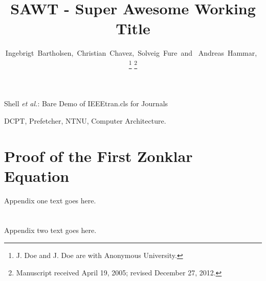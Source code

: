 \documentclass[journal]{IEEEtran}
\begin{document}
\title{SAWT - Super Awesome Working Title}

\author{Ingebrigt~Bartholsen,~Christian~Chavez,~Solveig~Fure~and ~Andreas~Hammar,~


\thanks{J. Doe and J. Doe are with Anonymous University.}
\thanks{Manuscript received April 19, 2005; revised December 27, 2012.}}

%
{Shell \MakeLowercase{\textit{et al.}}: Bare Demo of IEEEtran.cls for Journals}


\maketitle



\begin{IEEEkeywords}
DCPT, Prefetcher, NTNU, Computer Architecture.
\end{IEEEkeywords}
\IEEEpeerreviewmaketitle

















\appendices
\section{Proof of the First Zonklar Equation}
Appendix one text goes here.

\section{}
Appendix two text goes here.

\ifCLASSOPTIONcaptionsoff
  \newpage
\fi


\end{document}
